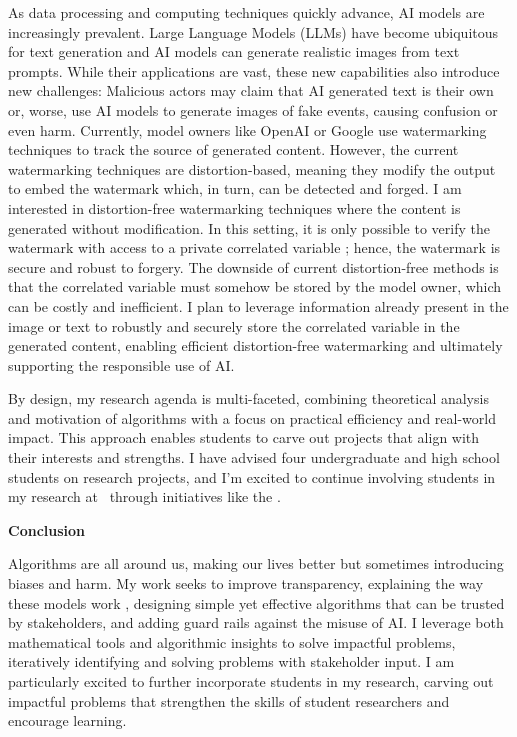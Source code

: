 \documentclass[11pt]{article}
\begin{document}
{As data processing and computing techniques quickly advance, AI models are increasingly prevalent.
Large Language Models (LLMs) have become ubiquitous for text generation and AI models can generate realistic images from text prompts.
While their applications are vast, these new capabilities also introduce new challenges:
Malicious actors may claim that AI generated text is their own or, worse, use AI models to generate images of fake events, causing confusion or even harm.
Currently, model owners like OpenAI or Google use watermarking techniques to track the source of generated content.
However, the current watermarking techniques are distortion-based, meaning they modify the output to embed the watermark which, in turn, can be detected and forged.
I am interested in distortion-free watermarking techniques where the content is generated without modification.
In this setting, it is only possible to verify the watermark with access to a private correlated variable \cite{arabi2024hidden}; hence, the watermark is secure and robust to forgery.
The downside of current distortion-free methods is that the correlated variable must somehow be stored by the model owner, which can be costly and inefficient.
I plan to leverage information already present in the image or text to robustly and securely store the correlated variable in the generated content, enabling efficient distortion-free watermarking and ultimately supporting the responsible use of AI.

By design, my research agenda is multi-faceted, combining theoretical analysis and motivation of algorithms with a focus on practical efficiency and real-world impact. This approach enables students to carve out projects that align with their interests and strengths. 
I have advised four undergraduate and high school students on research projects, and I'm excited to continue involving students in my research at \school~through initiatives like the \program.

{ \large \textbf{Conclusion}}

Algorithms are all around us, making our lives better but sometimes introducing biases and harm. My work seeks to improve transparency, explaining the way these models work , designing simple yet effective algorithms that can be trusted by stakeholders, and adding guard rails against the misuse of AI. I leverage both mathematical tools and algorithmic insights to solve impactful problems, iteratively identifying and solving problems with stakeholder input. I am particularly excited to further incorporate students in my research, carving out impactful problems that strengthen the skills of student researchers and encourage learning.

}
\end{document}
